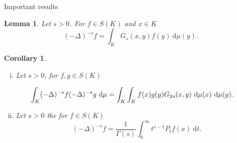 \documentclass{beamer}
\newtheorem{lem}[theorems]{Lemma}
\newtheorem{coro}[theorems]{Corollary}
\newcommand{\dd}{\ \text{d}}
\begin{document}
	\begin{frame}{Important results}
		
		\vspace{2.5em}
		\setcounter{theorems}{40}
		\begin{lem}\label{fractionalLaplacianIsRieszKernel}
			Let $s > 0$. For $f \in S(K)$ and $x \in K$
			\vspace{-0.5em}
			\begin{equation}
				(-\Delta)^{-s}f = \int_{K}G_s(x,y)f(y) \dd \mu(y).
			\end{equation}
		\end{lem}
		\pause
\begin{coro}\label{coro:ForRieszKernelAndFractionalLaplacian}
	\begin{enumerate}[(i)]
		\item 	Let $s > 0$, for $f,g \in S(K)$ \label{coroRiesz1}
		
		\vspace{-1.5em}
		\begin{equation}
			\hspace{-1.3em} \int_{K} (-\Delta)^{-s} f (-\Delta)^{-s} g \dd \mu = \int_{K}\int_{K} f(x)g(y)G_{2s}(x,y) \dd \mu(x) \dd \mu (y).
		\end{equation}
		
			\vspace{-0.5em}
			\item Let $s > 0$ the for $f \in S(K)$\label{coroRiesz2}
			\vspace{-0.7em}
			\begin{equation}
				(-\Delta)^{-s}f = \frac{1}{\Gamma(s)}\int_{0}^{\infty} t^{s-1}P_tf(x) \dd t.
			\end{equation}
			\end{enumerate}
		\end{coro}		
	\end{frame}
	
\end{document}
